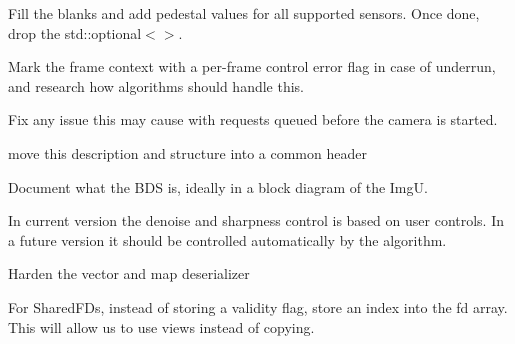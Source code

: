 \begin{DoxyRefList}
%
Fill the blanks and add pedestal values for all supported sensors. Once done, drop the std\+::optional$<$$>$. 
\item[Class \doxylink{classlibcamera_1_1ipa_1_1FCQueue}{libcamera\+::ipa\+::FCQueue\texorpdfstring{$<$}{<} Frame\+Context \texorpdfstring{$>$}{>}} ]\label{todo__todo000008}%
%
Mark the frame context with a per-\/frame control error flag in case of underrun, and research how algorithms should handle this. 
\item[Member \doxylink{classlibcamera_1_1ipa_1_1FCQueue_a7a76eebb86d4d5b41fff9d4e950fb385}{libcamera\+::ipa\+::FCQueue\texorpdfstring{$<$}{<} Frame\+Context \texorpdfstring{$>$}{>}\+::clear} ()]\label{todo__todo000009}%
%
Fix any issue this may cause with requests queued before the camera is started.  
\item[Struct \doxylink{structlibcamera_1_1ipa_1_1ipu3_1_1algorithms_1_1Accumulator}{libcamera\+::ipa\+::ipu3\+::algorithms\+::Accumulator} ]\label{todo__todo000003}%
%
move this description and structure into a common header 
\item[Member \doxylink{classlibcamera_1_1ipa_1_1ipu3_1_1IPAIPU3_a9206f03f723d4eaedc61de71d44b311b}{libcamera\+::ipa\+::ipu3\+::IPAIPU3\+::configure} (const IPAConfig\+Info \&config\+Info, \doxylink{classlibcamera_1_1ControlInfoMap}{Control\+Info\+Map} \texorpdfstring{$\ast$}{*}ipa\+Controls) override]\label{todo__todo000005}%
%
Document what the BDS is, ideally in a block diagram of the ImgU. 
\item[Class \doxylink{classlibcamera_1_1ipa_1_1rkisp1_1_1algorithms_1_1Filter}{libcamera\+::ipa\+::rkisp1\+::algorithms\+::Filter} ]\label{todo__todo000010}%
%
In current version the denoise and sharpness control is based on user controls. In a future version it should be controlled automatically by the algorithm.  
\item[Class \doxylink{classlibcamera_1_1IPADataSerializer}{libcamera\+::IPAData\+Serializer\texorpdfstring{$<$}{<} T \texorpdfstring{$>$}{>}} ]\label{todo__todo000030}%
%
Harden the vector and map deserializer

\label{todo__todo000031}%
%
For Shared\+FDs, instead of storing a validity flag, store an index into the fd array. This will allow us to use views instead of copying. 


\end{DoxyRefList}
